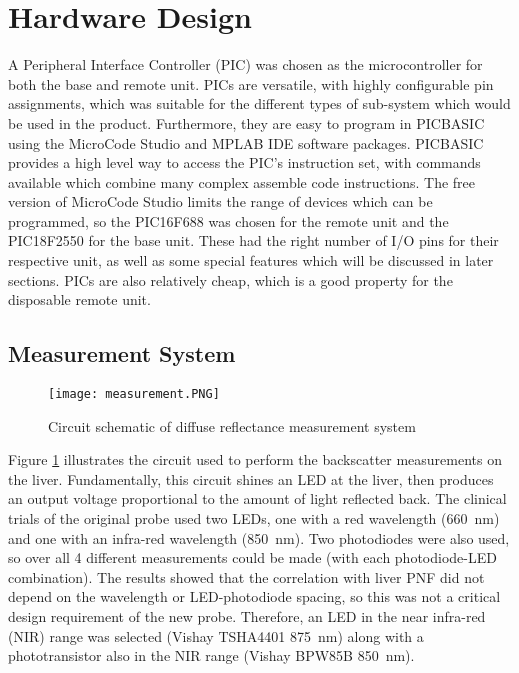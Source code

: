 \section{Hardware Design}

A Peripheral Interface Controller (PIC) was chosen as the microcontroller for both the base and remote unit. PICs are versatile, with highly configurable pin assignments, which was suitable for the different types of sub-system which would be used in the product. Furthermore, they are easy to program in PICBASIC using the MicroCode Studio and MPLAB IDE software packages. PICBASIC provides a high level way to access the PIC's instruction set, with commands available which combine many complex assemble code instructions. The free version of MicroCode Studio limits the range of devices which can be programmed, so the PIC16F688 \cite{pic16f688} was chosen for the remote unit and the PIC18F2550 \cite{pic18f2550} for the base unit. These had the right number of I/O pins for their respective unit, as well as some special features which will be discussed in later sections. PICs are also relatively cheap, which is a good property for the disposable remote unit.\\

\subsection{Measurement System}
\begin{figure}[h]
	\centering
	\texttt{[image: measurement.PNG]}
	\caption{Circuit schematic of diffuse reflectance measurement system}
	\label{fig: measurement schematic}
\end{figure}

Figure \ref{fig: measurement schematic} illustrates the circuit used to perform the backscatter measurements on the liver. Fundamentally, this circuit shines an LED at the liver, then produces an output voltage proportional to the amount of light reflected back. The clinical trials of the original probe \cite{Robertson} used two LEDs, one with a red wavelength (\SI{660}{\nano\metre}) and one with an infra-red wavelength (\SI{850}{\nano\metre}). Two photodiodes were also used, so over all 4 different measurements could be made (with each photodiode-LED combination). The results showed that the correlation with liver PNF did not depend on the wavelength or LED-photodiode spacing, so this was not a critical design requirement of the new probe. Therefore, an LED in the near infra-red (NIR) range was selected (Vishay TSHA4401 \cite{tsha4401} \SI{875}{\nano\metre}) along with a phototransistor also in the NIR range (Vishay BPW85B \cite{bpw85b} \SI{850}{\nano\metre}).\\

